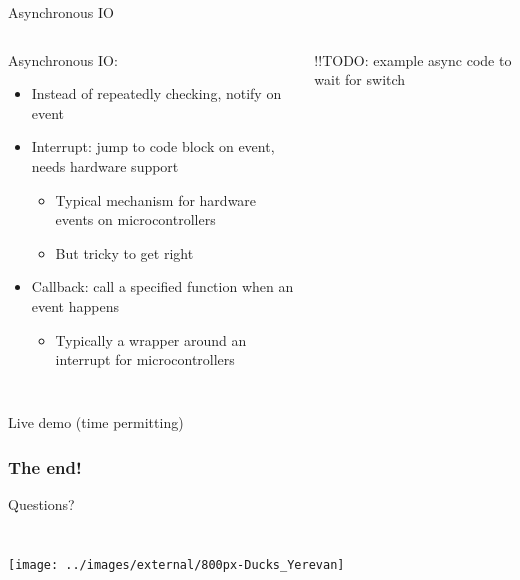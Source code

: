 \documentclass{beamer}
\begin{document}
\begin{frame}{Asynchronous IO}
  \begin{columns}[T]
    \begin{column}{.6\textwidth}
      Asynchronous IO:
      \begin{itemize}
        \item Instead of repeatedly checking, notify on event
        \item Interrupt: jump to code block on event, needs hardware support
        \begin{itemize}
          \item Typical mechanism for hardware events on microcontrollers
          \item But tricky to get right
        \end{itemize}
        \item Callback: call a specified function when an event happens
        \begin{itemize}
          \item Typically a wrapper around an interrupt for microcontrollers
        \end{itemize}
      \end{itemize}
    \end{column}

    \begin{column}{0.4\textwidth}
      !!TODO: example async code to wait for switch
    \end{column}
  \end{columns}
\end{frame}

\subsection{}
\begin{frame}{Live demo (time permitting)}
\end{frame}

\begin{frame}[plain]
\frametitle{The end!} \centering
  Questions? \\
  ~ \\
  ~ \\
  \texttt{[image: ../images/external/800px-Ducks\_Yerevan]}
\end{frame}
\end{document}
